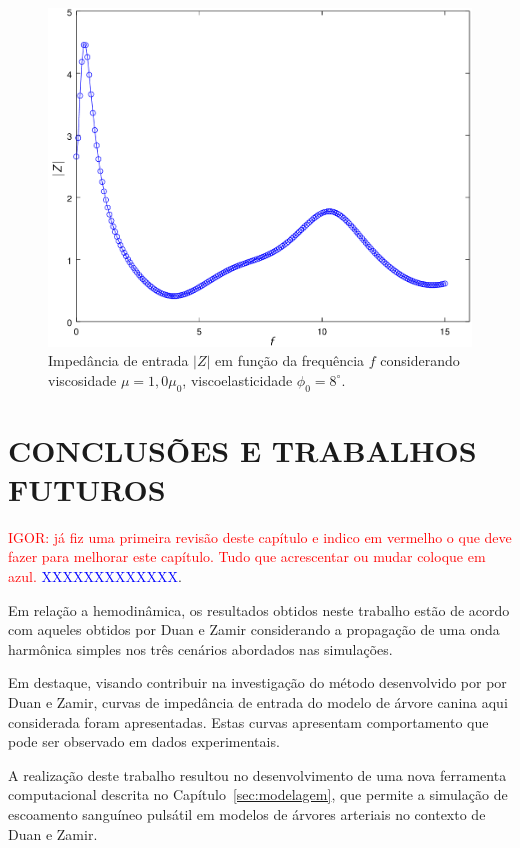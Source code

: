 \documentclass[
        english,			
        brazil			        %
        ,<...>]{abntbibufjf}
\begin{document}
\begin{figure}[!htbp]
	\centering
	\includegraphics[scale=0.7]{figure-result-impedance/fig_viscosidade1_viscoelasticity8_impedance_new.png}
	\caption{Impedância de entrada $|Z|$ em função da frequência $f$ considerando viscosidade $\mu = 1,0 \mu_0$, viscoelasticidade $\phi_0 = 8^{\circ}$.}
	\label{fig5b:arterial-tree}%
\end{figure}

\chapter{CONCLUSÕES E TRABALHOS FUTUROS}
\textcolor{red}{IGOR: já fiz uma primeira revisão deste capítulo e indico em vermelho o que deve fazer para melhorar este capítulo. Tudo que acrescentar ou mudar coloque em azul.}
\textcolor{blue}{XXXXXXXXXXXXX}.

Em relação a hemodinâmica, os resultados obtidos neste trabalho estão de acordo com aqueles obtidos por Duan e Zamir\textcolor{blue}{ \cite{Duan1992} } considerando a propagação de uma onda harmônica simples nos três cenários abordados nas simulações. 

Em destaque, visando contribuir na investigação do método desenvolvido por por Duan e Zamir, curvas de impedância de entrada do modelo de árvore canina aqui considerada foram apresentadas. Estas curvas apresentam comportamento que pode ser observado em dados experimentais.

A realização deste trabalho resultou no desenvolvimento de uma nova ferramenta computacional descrita no Capítulo~\ref{sec:modelagem}, que permite a simulação de escoamento sanguíneo pulsátil em modelos de árvores arteriais no contexto de Duan e Zamir. 
\end{document}
